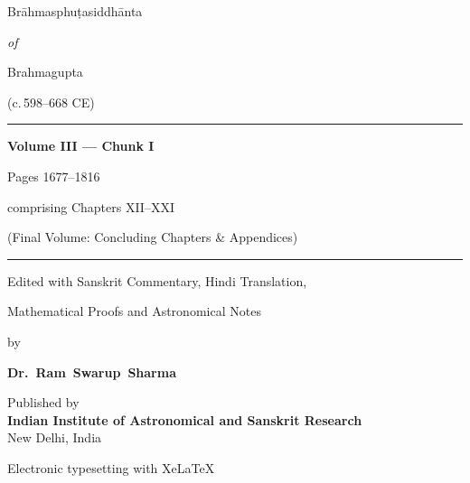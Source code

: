\documentclass[11pt,a4paper]{article}
\newcommand{\shortline}{\noindent\rule{0.5\textwidth}{0.4pt}\par}
\newcommand{\devbf}[1]{{\devanagarifont\bfseries #1}}
\begin{document}
\begin{titlepage}
\centering
\vspace*{2cm}

{\Huge\color{titlecolor}\devbf{ब्राह्मस्फुटसिद्धान्त}\par}
\vspace{0.5cm}
{\LARGE\color{sectioncolor} Br\=ahmasphu\d tasiddh\=anta\par}
\vspace{1.5cm}

{\Large\textit{of}\par}
\vspace{0.5cm}
{\LARGE\color{titlecolor}\devbf{ब्रह्मगुप्त}\par}
\vspace{0.3cm}
{\Large Brahmagupta\par}
\vspace{0.3cm}
{\large (c.\,598--668 CE)\par}

\vspace{2cm}
\shortline
\vspace{1cm}

{\Large\bfseries Volume III --- Chunk I\par}
\vspace{0.5cm}
{\large Pages 1677--1816\par}
\vspace{0.3cm}
{\normalsize comprising Chapters XII--XXI\par}
\vspace{0.5cm}
{\large (Final Volume: Concluding Chapters \& Appendices)\par}

\vspace{1.5cm}
\shortline
\vspace{1cm}

{\normalsize Edited with Sanskrit Commentary, Hindi Translation,\par}
\vspace{0.2cm}
{\normalsize Mathematical Proofs and Astronomical Notes\par}
\vspace{0.5cm}
{\large by\par}
\vspace{0.3cm}
{\large\bfseries Dr.~Ram~Swarup~Sharma\par}

\vspace{1.5cm}
{\small Published by\\
\textbf{Indian Institute of Astronomical and Sanskrit Research}\\
New Delhi, India\par}

\vfill
{\footnotesize Electronic typesetting with XeLaTeX\par}
\end{titlepage}
\end{document}

